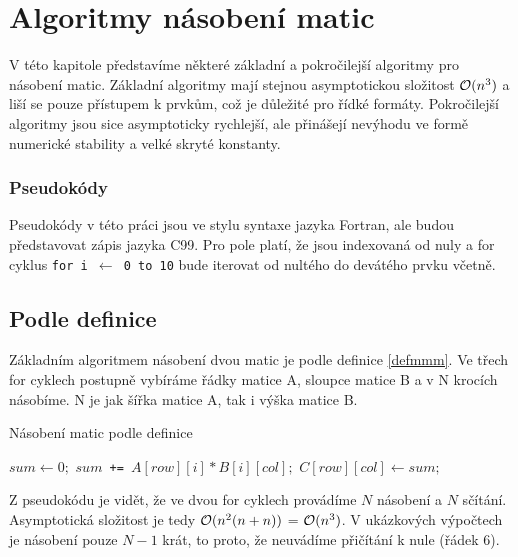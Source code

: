 \chapter{Algoritmy násobení matic}
\label{algo}

V této kapitole představíme některé základní a pokročilejší algoritmy pro násobení matic. Základní algoritmy mají stejnou asymptotickou složitost $\mathcal{O}(n^3)$ a liší se pouze přístupem k prvkům, což je důležité pro řídké formáty. Pokročilejší algoritmy jsou sice asymptoticky rychlejší, ale přinášejí nevýhodu ve formě numerické stability a velké skryté konstanty.

\subsection{Pseudokódy}

Pseudokódy v této práci jsou ve stylu syntaxe jazyka Fortran, ale budou představovat zápis jazyka C99. Pro pole platí, že jsou indexovaná od nuly a for cyklus \texttt{for i $\gets$ 0 to 10} bude iterovat od nultého do devátého prvku včetně.

\section{Podle definice}

Základním algoritmem násobení dvou matic je podle definice \ref{defmmm}. Ve třech for cyklech postupně  vybíráme řádky matice A, sloupce matice B a v N krocích násobíme. N je jak šířka matice A, tak i výška matice B.

\begin{algorithm}[H]
	\caption{Násobení matic podle definice}\label{mmm-by-definiton}
	\begin{algorithmic}[1]
		\State \texttt{$sum \gets 0;$}
			\State \texttt{$sum $ += $ A[row][i] * B[i][col];$}
		\EndFor
		\State \texttt{$C[row][col] \gets sum;$}
	\EndFor
\EndFor
		\EndProcedure
	\end{algorithmic}
\end{algorithm}

Z pseudokódu je vidět, že ve dvou for cyklech provádíme $N$ násobení a $N$ sčítání. Asymptotická složitost je tedy $\mathcal{O}(n^2(n + n))$ = $\mathcal{O}(n^3)$. V ukázkových výpočtech je násobení pouze $N-1$ krát, to proto, že neuvádíme přičítání k nule (řádek 6).

